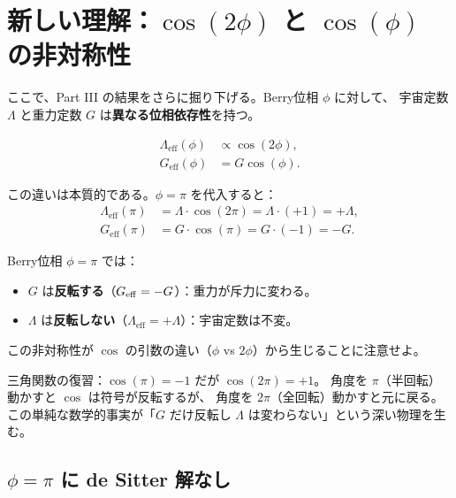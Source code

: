 \section{新しい理解：$\cos(2\phi)$ と $\cos(\phi)$ の非対称性}
\label{sec:11.2}

ここで、Part III の結果をさらに掘り下げる。Berry位相 $\phi$ に対して、
宇宙定数 $\Lambda$ と重力定数 $G$ は\textbf{異なる位相依存性}を持つ。

\begin{dfnbox}
\begin{align}
  \Lambda_{\mathrm{eff}}(\phi) &\propto \cos(2\phi), \label{eq:lambda-phi} \\
  G_{\mathrm{eff}}(\phi) &= G\cos(\phi). \label{eq:g-phi}
\end{align}
\end{dfnbox}

この違いは本質的である。$\phi = \pi$ を代入すると：
\begin{align}
  \Lambda_{\mathrm{eff}}(\pi) &= \Lambda \cdot \cos(2\pi) = \Lambda \cdot (+1) = +\Lambda, \\
  G_{\mathrm{eff}}(\pi) &= G \cdot \cos(\pi) = G \cdot (-1) = -G.
\end{align}

\begin{keyresult}[$\phi = \pi$ での非対称性]
Berry位相 $\phi = \pi$ では：
\begin{itemize}
  \item $G$ は\textbf{反転する}（$G_{\mathrm{eff}} = -G$）：重力が斥力に変わる。
  \item $\Lambda$ は\textbf{反転しない}（$\Lambda_{\mathrm{eff}} = +\Lambda$）：宇宙定数は不変。
\end{itemize}
この非対称性が $\cos$ の引数の違い（$\phi$ vs $2\phi$）から生じることに注意せよ。
\end{keyresult}

\begin{hsbox}
三角関数の復習：$\cos(\pi) = -1$ だが $\cos(2\pi) = +1$。
角度を $\pi$（半回転）動かすと $\cos$ は符号が反転するが、
角度を $2\pi$（全回転）動かすと元に戻る。
この単純な数学的事実が「$G$ だけ反転し $\Lambda$ は変わらない」という深い物理を生む。
\end{hsbox}

\subsection{$\phi = \pi$ に de Sitter 解なし}

